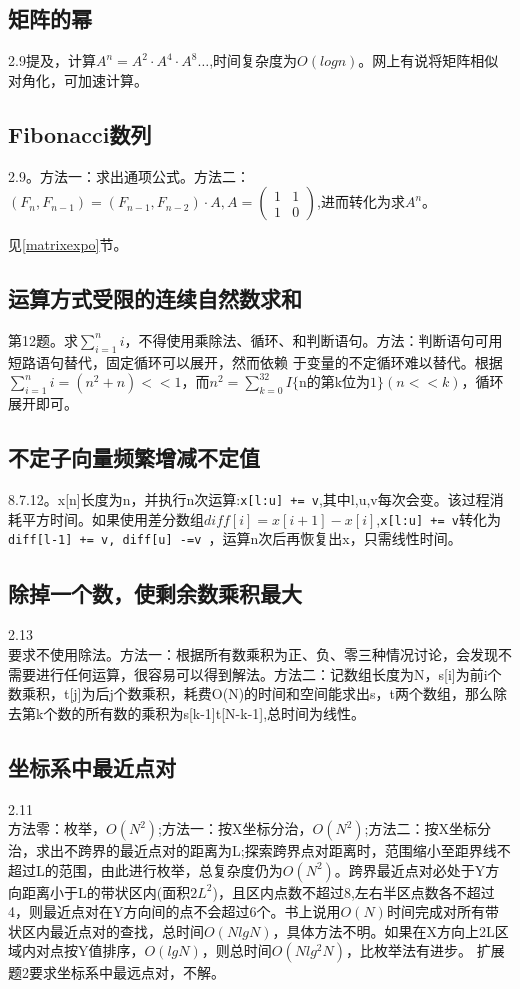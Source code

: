 \subsection{矩阵的幂}
\cite{bop}2.9提及，计算$A^n=A^{2} \cdot A^{4} \cdot A^{8}\dots$,时间复杂度为$O(logn)$。网上有说将矩阵相似对角化，可加速计算。
\label{matrixexpo}
\subsection{Fibonacci数列}
\cite{bop}2.9。方法一：求出通项公式。方法二：$(F_n,F_{n-1})=(F_{n-1},F_{n-2})\cdot A, A=  \left( \begin{array}{cc}1&1\\1&0\end{array}\right)$,进而转化为求$A^n$。

见\ref{matrixexpo}节。



\subsection{运算方式受限的连续自然数求和}
\cite{ms100}第12题。求$ \sum_{i=1}^{n}i $，不得使用乘除法、循环、和判断语句。方法：判断语句可用短路语句替代，固定循环可以展开，然而依赖
于变量的不定循环难以替代。根据$ \sum_{i=1}^{n}i = (n^{2}+n)<<1$，而$n^{2}=\sum_{k=0}^{32}I\{\textrm{n的第k位为1}\}(n<<k)$，循环展开即可。
\subsection{不定子向量频繁增减不定值}
\cite{pp}8.7.12。x[n]长度为n，并执行n次运算:\verb|x[l:u] += v|,其中l,u,v每次会变。该过程消耗平方时间。如果使用差分数组$diff[i]=x[i+1]-x[i]$,\verb|x[l:u] += v|转化为\verb|diff[l-1] += v, diff[u] -=v |，运算n次后再恢复出x，只需线性时间。

\subsection{除掉一个数，使剩余数乘积最大}
\cite{bop}2.13\\
要求不使用除法。方法一：根据所有数乘积为正、负、零三种情况讨论，会发现不需要进行任何运算，很容易可以得到解法。方法二：记数组长度为N，s[i]为前i个数乘积，t[j]为后j个数乘积，耗费O(N)的时间和空间能求出s，t两个数组，那么除去第k个数的所有数的乘积为s[k-1]t[N-k-1],总时间为线性。



\subsection{坐标系中最近点对}
\cite{bop}2.11\\
方法零：枚举，$O(N^2)$;方法一：按X坐标分治，$O(N^2)$;方法二：按X坐标分治，求出不跨界的最近点对的距离为L;探索跨界点对距离时，范围缩小至距界线不超过L的范围，由此进行枚举，总复杂度仍为$O(N^2)$。跨界最近点对必处于Y方向距离小于L的带状区内(面积$2L^2$)，且区内点数不超过8,左右半区点数各不超过4，则最近点对在Y方向间的点不会超过6个。书上说用$O(N)$时间完成对所有带状区内最近点对的查找，总时间$O(NlgN)$，具体方法不明。如果在X方向上2L区域内对点按Y值排序，$O(lgN)$，则总时间$O(Nlg^{2}N)$，比枚举法有进步。
扩展题2要求坐标系中最远点对，不解。

